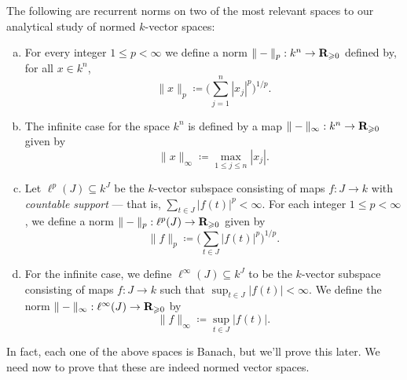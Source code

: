 \begin{example}[\(p\)-norms]
    \label{exp:p-norms}
    The following are recurrent norms on two of the most relevant spaces to our
    analytical study of normed \(k\)-vector spaces:
    \begin{enumerate}[(a)]\setlength\itemsep{0em}
        \item For every integer \(1 \leq p < \infty\) we define a norm \(\| - \|_p: k^n
              \to \mathbf{R}_{\geqslant 0}\) defined by, for all \(x \in k^n\),
              \[
                  \| x \|_p \coloneq \bigg( \sum_{j=1}^n |x_j|^p \bigg)^{1/p}.
              \]

        \item The infinite case for the space \(k^n\) is defined by a map
              \(\| - \|_{\infty}: k^n \to \mathbf{R}_{\geqslant 0}\) given by
              \[
                  \| x \|_{\infty} \coloneq \max_{1 \leq j \leq n} |x_j|.
              \]

        \item Let \(\ell^p(J) \subseteq k^J\) be the \(k\)-vector subspace consisting of
              maps \(f: J \to k\) with \emph{countable support} --- that is, \(\sum_{t \in J}
              |f(t)|^p < \infty\). For each integer \(1 \leq p < \infty\), we define a norm
              \(\| - \|_p: \ell^p(J) \to \mathbf{R}_{\geqslant 0}\) given by
              \[
                  \| f \|_p \coloneq \bigg( \sum_{t \in J} |f(t)|^p \bigg)^{1/p}.
              \]

        \item For the infinite case, we define \(\ell^{\infty}(J) \subseteq k^{J}\) to
              be the \(k\)-vector subspace consisting of maps \(f: J \to k\) such that
              \(\sup_{t \in J} |f(t)| < \infty\). We define the norm \(\| - \|_{\infty}:
              \ell^{\infty}(J) \to \mathbf{R}_{\geqslant 0}\) by
              \[
                  \| f \|_{\infty} \coloneq \sup_{t \in J} |f(t)|.
              \]
    \end{enumerate}
    In fact, each one of the above spaces is Banach, but we'll prove this later.
    We need now to prove that these are indeed normed vector spaces.
\end{example}

